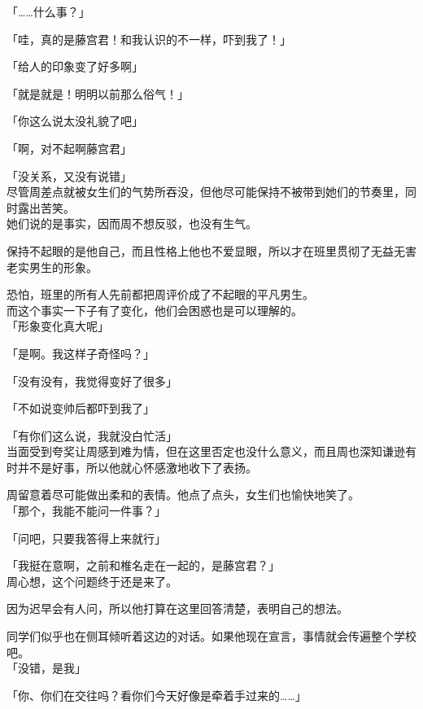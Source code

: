 「……什么事？」

「哇，真的是藤宫君！和我认识的不一样，吓到我了！」

「给人的印象变了好多啊」

「就是就是！明明以前那么俗气！」

「你这么说太没礼貌了吧」

「啊，对不起啊藤宫君」

「没关系，又没有说错」\\

尽管周差点就被女生们的气势所吞没，但他尽可能保持不被带到她们的节奏里，同时露出苦笑。\\

她们说的是事实，因而周不想反驳，也没有生气。

保持不起眼的是他自己，而且性格上他也不爱显眼，所以才在班里贯彻了无益无害老实男生的形象。

恐怕，班里的所有人先前都把周评价成了不起眼的平凡男生。\\

而这个事实一下子有了变化，他们会困惑也是可以理解的。\\

「形象变化真大呢」

「是啊。我这样子奇怪吗？」

「没有没有，我觉得变好了很多」

「不如说变帅后都吓到我了」

「有你们这么说，我就没白忙活」\\

当面受到夸奖让周感到难为情，但在这里否定也没什么意义，而且周也深知谦逊有时并不是好事，所以他就心怀感激地收下了表扬。

周留意着尽可能做出柔和的表情。他点了点头，女生们也愉快地笑了。\\

「那个，我能不能问一件事？」

「问吧，只要我答得上来就行」

「我挺在意啊，之前和椎名走在一起的，是藤宫君？」\\

周心想，这个问题终于还是来了。

因为迟早会有人问，所以他打算在这里回答清楚，表明自己的想法。

同学们似乎也在侧耳倾听着这边的对话。如果他现在宣言，事情就会传遍整个学校吧。\\

「没错，是我」

「你、你们在交往吗？看你们今天好像是牵着手过来的……」

